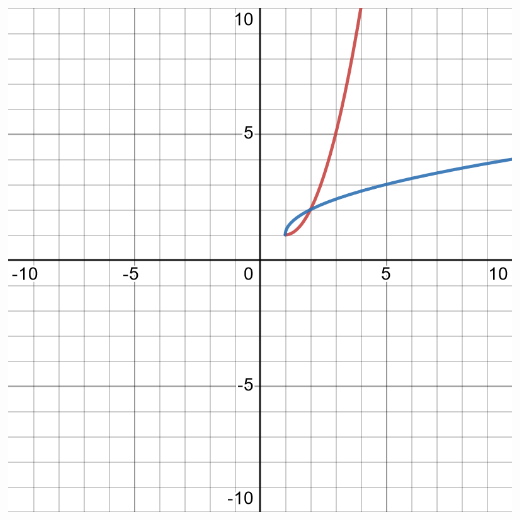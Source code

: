 \documentclass[12pt,fleqn,answers]{exam}
\begin{document}
\begin{questions}
\begin{solution}
\begin{center}
\includegraphics[scale=0.25]{desmos-graph(27).png}
\end{center}


\end{solution}
\end{questions}
\end{document}
